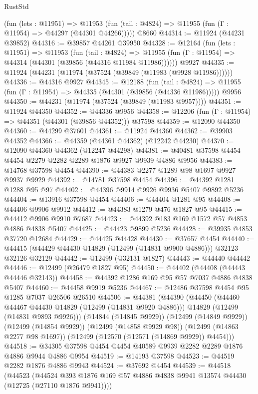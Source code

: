 \begin{lexlean}{RustStd}
\begin{coremodule}
{\begin{coremodule}
{{{{{{{{{{{{{{{{{{{{{{{{{{{{{{{{{{{{{{{{{{{{{{{{{{{{{{{{{{{{{{{{{{{{{{{{{{{{{{{{      (fun (lets : @11951) =>
      @11953 (fun (tail : @4824) => @11955 (fun (Γ : @11954) => @44297 (@44301 @44266)))))
    @8660
@44314 := @11924 (@44231 @39852)
@44316 := @39857 @44261 @39950
@44328 := @12164
    (fun (lets : @11951) =>
    @11953
      (fun (tail : @4824) =>
      @11955 (fun (Γ : @11954) => @44314 (@44301 (@39856 (@44316 @11984 @11986))))))
    @9927
@44335 := @11924 (@44231 (@11974 (@37524 (@39849 (@11983 (@9928 @11986))))))
@44336 := @44316 @9927
@44345 := @12188
    (fun (tail : @4824) => @11955 (fun (Γ : @11954) => @44335 (@44301 (@39856 (@44336 @11986)))))
    @9956
@44350 := @44231 (@11974 (@37524 (@39849 (@11983 @9957))))
@44351 := @11924 @44350
@44352 := @44336 @9956
@44358 := @12206 (fun (Γ : @11954) => @44351 (@44301 (@39856 @44352))) @37598
@44359 := @12090 @44350
@44360 := @44299 @37601
@44361 := @11924 @44360
@44362 := @39903 @44352
@44366 := @44359 (@44361 @44362) (@12242 @44230)
@44370 := @12090 @44360 @44362 (@12247 @44298)
@44381 := @40481 @37598 @4454 @4454 @2279 @2282 @2289 @1876 @9927 @9939 @4886 @9956
@44383 := @14768 @37598 @4454
@44390 := @44383 @2277 @1289 @98 @1697 @9927 @9937 @9929
@44392 := @14781 @37598 @4454
@44396 := @44392 @1281 @1288 @95 @97
@44402 := @44396 @9914 @9926 @9936 @5407 @9892 @5236
@44404 := @13916 @37598 @4454
@44406 := @44404 @1281 @95
@44408 := @44406 @9906 @9912
@44412 := @44383 @1279 @476 @1827 @95
@44415 := @44412 @9906 @9910 @7687
@44423 := @44392 @183 @169 @1572 @57 @4853 @4886 @4838 @5407
@44425 := @44423 @9899 @5236
@44428 := @39935 @4853 @37720 @12684
@44429 := @44425 @44428
@44430 := @37657 @4454
@44440 := @44415 (@44429 @44430 @14829 (@12499 (@14831 @9900 @4886))) @32123 @32126 @32129
@44442 := @12499 (@32131 @1827)
@44443 := @44440 @44442
@44446 := @12499 (@26479 @1827 @95)
@44450 := @44402 (@44408 (@44443 @44446 @32143))
@44458 := @44392 @1286 @169 @95 @57 @7037 @4886 @4838 @5407
@44460 := @44458 @9919 @5236
@44467 := @12486 @37598 @4454 @95 @1285 @7037 @26506 @26510
@44506 := @44381
    (@44390
      (@44450
        (@44460 @44467 @44430 @14829 (@12499 (@14831 @9920 @4886)))
        @14829
        (@12499 (@14831 @9893 @9926)))
      (@14844 (@14845 @9929))
      (@12499 (@14849 @9929))
      (@12499 (@14854 @9929))
      (@12499 (@14858 @9929 @98))
      (@12499 (@14863 @2277 @98 @1697))
      (@12499 (@12570 (@12571 (@14869 @9929)) @4454)))
@44518 := @34305 @37598 @4454 @4454 @40589 @9939 @2282 @2289 @1876 @4886 @9944 @4886 @9954
@44519 := @14193 @37598
@44523 := @44519 @2282 @1876 @4886 @9943
@44524 := @37692 @4454
@44539 := @44518
    (@44523
      (@44524 @393 @1876 @169 @57 @4886 @4838 @9941 @13574 @44430 (@12725 (@27110 @1876 @9941))))
}}}}}}}}}}}}}}}}}}}}}}}}}}}}}}}}}}}}}}}}}}}}}}}}}}}}}}}}}}}}}}}}}}}}}}}}}}}}}}}}
\end{coremodule}}
\end{coremodule}
\end{lexlean}
